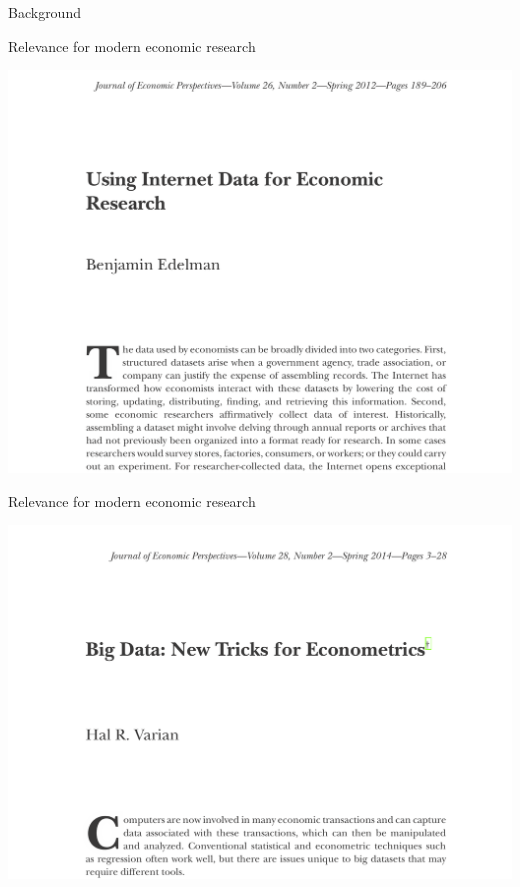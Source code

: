 \documentclass[
  ignorenonframetext,
]{beamer}
\begin{document}
\begin{frame}{Background}
\begin{block}{Relevance for modern economic research}
\protect\hypertarget{relevance-for-modern-economic-research-1}{}
\begin{center}\includegraphics[width=0.9\linewidth]{../../img/internet} \end{center}
\end{block}

\begin{block}{Relevance for modern economic research}
\protect\hypertarget{relevance-for-modern-economic-research-2}{}
\begin{center}\includegraphics[width=0.9\linewidth]{../../img/bigdata} \end{center}
\end{block}


\end{frame}
\end{document}
